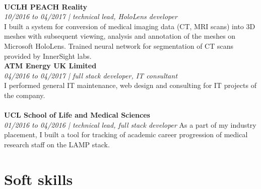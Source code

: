 \documentclass{article}
\begin{document}
\begin{multicols}{2}
\vspace{2mm}
\\
\textbf{UCLH PEACH Reality} \\
\emph{\color{gray} 10/2016 to 04/2017 | technical lead, HoloLens developer} \\
I built a system for conversion of medical imaging data (CT, MRI scans) into 3D meshes with subsequent viewing, analysis and annotation of the meshes on Microsoft HoloLens. Trained neural network for segmentation of CT scans provided by InnerSight labs.
\vspace{2mm}
\\
\textbf{ATM Energy UK Limited} \\
\emph{\color{gray} 04/2016 to 04/2017 | full stack developer, IT consultant}\\
I performed general IT maintenance, web design and consulting for IT projects of the company.
\\\\
\textbf{UCL School of Life and Medical Sciences} \\
\emph{\color{gray} 01/2016 to 04/2016 | technical lead, full stack developer}
As a part of my industry placement, I built a tool for tracking of academic career progression of medical research staff on the LAMP stack.
\vfill

\columnbreak

\section*{\normalfont Soft skills}


\end{multicols}
\end{document}
